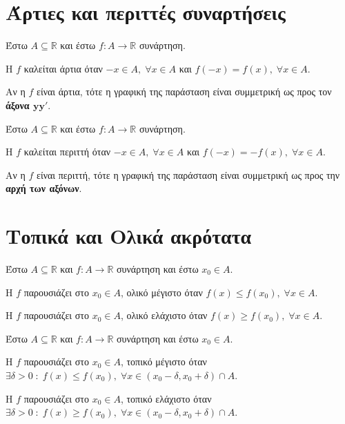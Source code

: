 \section{Άρτιες και περιττές συναρτήσεις}

\begin{dfn}
  Έστω $ A \subseteq \mathbb{R} $ και έστω $ f \colon A \to \mathbb{R} $ συνάρτηση. 
\item Η $f$ καλείται \textcolor{Col1}{άρτια} όταν $ -x \in A, \; \forall x \in A $ και $ f(-x) = f(x), \;
  \forall x \in A $.
\end{dfn}

\begin{rem}
  Αν η $f$ είναι άρτια, τότε η γραφική της παράσταση είναι συμμετρική ως προς τον
  \textbf{άξονα $\mathbf{yy'}$}.
\end{rem}

\begin{dfn}
  Έστω $ A \subseteq \mathbb{R} $ και έστω $ f \colon A \to \mathbb{R} $ συνάρτηση. 
\item Η $f$ καλείται \textcolor{Col1}{περιττή} όταν $ -x \in A, \; \forall x \in A $ και $ f(-x) = -f(x), \;
  \forall x \in A $.
\end{dfn}

\begin{rem}
  Αν η $f$ είναι περιττή, τότε η γραφική της παράσταση είναι συμμετρική ως προς την 
  \textbf{αρχή των αξόνων}.
\end{rem}

\section{Τοπικά και Ολικά ακρότατα}

\begin{dfn}
  Έστω $ A \subseteq \mathbb{R} $ και $ f \colon A \to \mathbb{R} $ συνάρτηση και 
  έστω $ x_{0} \in A $.
  \begin{myitemize}
  \item Η $f$ παρουσιάζει στο $ x_{0} \in A $, \textcolor{Col1}{ολικό μέγιστο} όταν $ f(x) \leq
      f(x_{0}), \; \forall x \in A $.
    \item Η $f$ παρουσιάζει στο $ x_{0} \in A $, \textcolor{Col1}{ολικό ελάχιστο} όταν $ f(x) \geq
      f(x_{0}), \; \forall x \in A $.
  \end{myitemize}
\end{dfn}

\begin{dfn}
  Έστω $ A \subseteq \mathbb{R} $ και $ f \colon A \to \mathbb{R} $ συνάρτηση και 
  έστω $ x_{0} \in A $.
  \begin{myitemize}
    \item Η $f$ παρουσιάζει στο $ x_{0} \in A $, \textcolor{Col1}{τοπικό μέγιστο} όταν $ \exists \delta >
      0 \; : \; f(x) \leq f(x_{0}), \; \forall x \in (x_{0}- \delta , x_{0}+ \delta)
      \cap A  $.
    \item Η $f$ παρουσιάζει στο $ x_{0} \in A $, \textcolor{Col1}{τοπικό ελάχιστο} όταν $ \exists \delta >
      0 \; : \; f(x) \geq f(x_{0}), \; \forall x \in (x_{0}- \delta , x_{0}+ \delta)
      \cap A  $.
  \end{myitemize}
\end{dfn}

